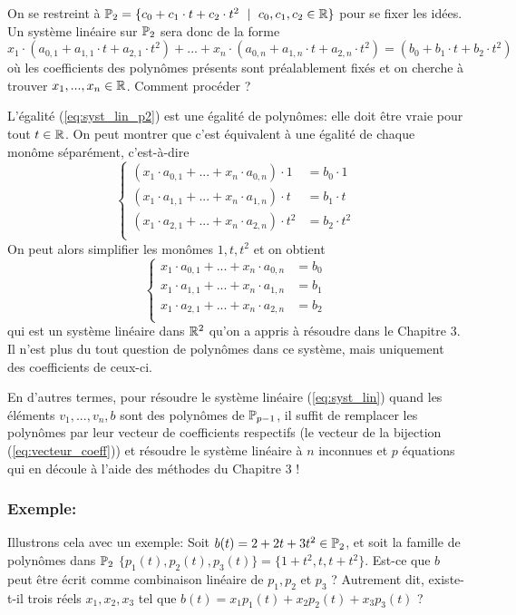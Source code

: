 On se restreint à $\P_2 = \{c_0 + c_1 \cdot t + c_2 \cdot t^2 \ \mid \ c_0, c_1, c_2 \in \R\}$ pour se fixer les idées. Un système linéaire sur $\P_2$ sera donc de la forme
\begin{equation}
    x_1 \cdot (a_{0,1} + a_{1,1} \cdot t + a_{2,1} \cdot t^2) + ... + x_n \cdot (a_{0,n} + a_{1,n} \cdot t + a_{2,n} \cdot t^2) = (b_0 + b_1 \cdot t + b_2 \cdot t^2)
    \label{eq:syst_lin_p2}
\end{equation}
où les coefficients des polynômes présents sont préalablement fixés et on cherche à trouver $x_1,...,x_n \in \R$. Comment procéder ?

L'égalité (\ref{eq:syst_lin_p2}) est une égalité de polynômes: elle doit être vraie pour tout $t \in \R$. On peut montrer que c'est équivalent à une égalité de chaque monôme séparément, c'est-à-dire
$$\begin{cases} (x_1 \cdot a_{0,1} + ... + x_n \cdot a_{0,n}) \cdot 1 &= b_0 \cdot 1 \\ 
(x_1 \cdot a_{1,1} + ... + x_n \cdot a_{1,n}) \cdot t &= b_1 \cdot t \\ 
(x_1 \cdot a_{2,1} + ... + x_n \cdot a_{2,n}) \cdot t^2 &= b_2 \cdot t^2 \\ 
\end{cases}$$
On peut alors simplifier les monômes $1, t, t^2$ et on obtient
$$\begin{cases} x_1 \cdot a_{0,1} + ... + x_n \cdot a_{0,n} &= b_0 \\ 
x_1 \cdot a_{1,1} + ... + x_n \cdot a_{1,n} &= b_1 \\ 
x_1 \cdot a_{2,1} + ... + x_n \cdot a_{2,n} &= b_2 \\ 
\end{cases}$$
qui est un système linéaire dans $\R^2$ qu'on a appris à résoudre dans le Chapitre 3. Il n'est plus du tout question de polynômes dans ce système, mais uniquement des coefficients de ceux-ci.

En d'autres termes, pour résoudre le système linéaire (\ref{eq:syst_lin}) quand les éléments $v_1, ..., v_n, b$ sont des polynômes de $\P_{p-1}$, il suffit de remplacer les polynômes par leur vecteur de coefficients respectifs (le vecteur de la bijection (\ref{eq:vecteur_coeff})) et résoudre le système linéaire à $n$ inconnues et $p$ équations qui en découle à l'aide des méthodes du Chapitre 3 !

\subsubsection{Exemple:}
Illustrons cela avec un exemple: Soit $b(t) = 2+2t+3t^2 \in \P_2$, et soit la famille de polynômes dans $\P_2$ $\{ p_1(t), p_2(t), p_3(t) \} = \{1+t^2, t, t+t^2\}$. Est-ce que $b$ peut être écrit comme combinaison linéaire de $p_1, p_2$ et $p_3$ ? Autrement dit, existe-t-il trois réels $x_1,x_2,x_3$ tel que $b(t) = x_1 p_1(t) + x_2 p_2 (t) + x_3 p_3 (t)$ ?


